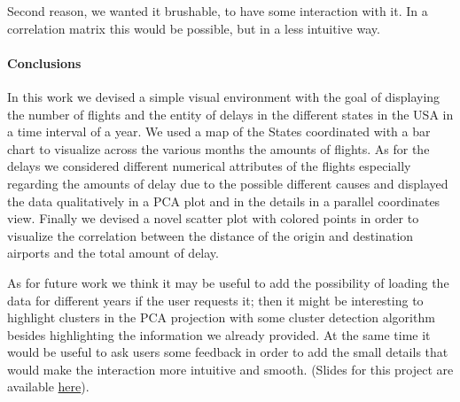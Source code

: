 \documentclass[a4paper, 12pt]{article}
\begin{document}
Second reason, we wanted it brushable, to have some interaction with it. In a correlation matrix this
would be possible, but in a less intuitive way.


\paragraph*{Conclusions}
In this work we devised a simple visual environment with the goal of displaying the number of flights 
and the entity of delays in the different states in the USA in a time interval of a year. We used a map
of the States coordinated with a bar chart to visualize across the various months the amounts of flights.
As for the delays we considered different numerical attributes of the flights especially regarding the
amounts of delay due to the possible different causes and displayed the data qualitatively in a PCA plot
and in the details in a parallel coordinates view. Finally we devised a novel scatter plot with colored
points in order to visualize the correlation between the distance of the origin and destination airports
and the total amount of delay.

As for future work we think it may be useful to add the possibility of loading the data for different
years if the user requests it; then it might be interesting to highlight clusters in the PCA projection
with some cluster detection algorithm besides highlighting the information we already provided. At the 
same time it would be useful to ask users some feedback in order to add the small details that would
make the interaction more intuitive and smooth.
(Slides for this project are available 
\href{https://docs.google.com/presentation/d/1T_p1oarqUuNt5APTaf7IwTJEzUDJC0CoNfJKHdak0so/edit?usp=sharing}{here}).
\end{document}
